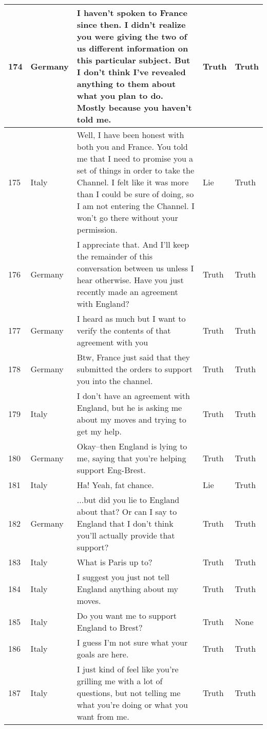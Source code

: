 \begin{longtable}{p{.3 cm} p{1.25cm} p{8.25cm} p{1.1cm} p{1.1cm}}
		\hline
		174 & Germany & I haven't spoken to France since then. I didn't realize you were giving the two of us different information on this particular subject. But I don't think I've revealed anything to them about what you plan to do. Mostly because you haven't told me. & Truth & Truth \\
		\hline
		175 & Italy & Well, I have been honest with both you and France. You told me that I need to promise you a set of things in order to take the Channel. I felt like it was more than I could be sure of doing, so I am not entering the Channel. I won't go there without your permission. & Lie & Truth \\
		\hline
		176 & Germany & I appreciate that. And I'll keep the remainder of this conversation between us unless I hear otherwise. Have you just recently made an agreement with England? & Truth & Truth \\
		\hline
		177 & Germany & I heard as much but I want to verify the contents of that agreement with you & Truth & Truth \\
		\hline
		178 & Germany & Btw, France just said that they submitted the orders to support you into the channel. & Truth & Truth \\
		\hline
		179 & Italy & I don't have an agreement with England, but he is asking me about my moves and trying to get my help. & Truth & Truth \\
		\hline
		180 & Germany & Okay--then England is lying to me, saying that you're helping support Eng-Brest. & Truth & Truth \\
		\hline
		181 & Italy & Ha! Yeah, fat chance. & Lie & Truth \\
		\hline
		182 & Germany & ...but did you lie to England about that? Or can I say to England that I don't think you'll actually provide that support? & Truth & Truth \\
		\hline
		183 & Italy & What is Paris up to? & Truth & Truth \\
		\hline
		184 & Italy & I suggest you just not tell England anything about my moves. & Truth & Truth \\
		\hline
		185 & Italy & Do you want me to support England to Brest? & Truth & None \\
		\hline
		186 & Italy & I guess I'm not sure what your goals are here. & Truth & Truth \\
		\hline
		187 & Italy & I just kind of feel like you're grilling me with a lot of questions, but not telling me what you're doing or what you want from me. & Truth & Truth \\

\end{longtable}
